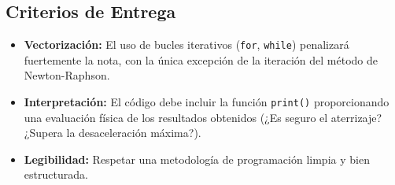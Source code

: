 	\subsection*{Criterios de Entrega}
	\begin{itemize}
		\item \textbf{Vectorización:} El uso de bucles iterativos (\texttt{for}, \texttt{while}) penalizará fuertemente la nota, con la única excepción de la iteración del método de Newton-Raphson.
		\item \textbf{Interpretación:} El código debe incluir la función \texttt{print()} proporcionando una evaluación física de los resultados obtenidos (¿Es seguro el aterrizaje? ¿Supera la desaceleración máxima?).
		\item \textbf{Legibilidad:} Respetar una metodología 
		de programación limpia y bien estructurada.
	\end{itemize}